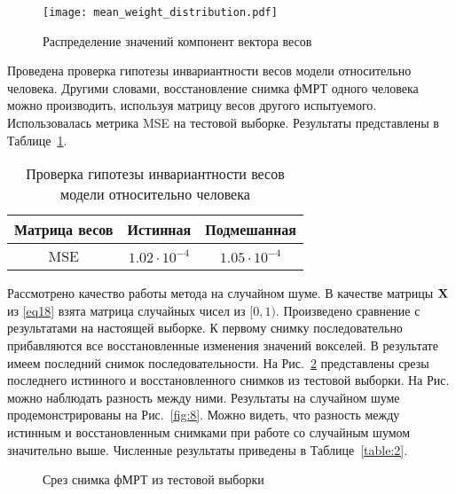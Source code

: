 \documentclass[a4paper, 12pt]{article}
\begin{document}
	\begin{figure}[h!]
		\centering
		\texttt{[image: mean\_weight\_distribution.pdf]}
		\caption{Распределение значений компонент вектора весов}
		\label{fig:6}
	\end{figure}

	Проведена проверка гипотезы инвариантности весов модели относительно человека.
	Другими словами, восстановление снимка фМРТ одного человека можно производить, используя
	матрицу весов другого испытуемого. Использовалась метрика MSE на тестовой выборке.
	Результаты представлены в Таблице~\ref{table:1}.

	\begin{table}[h!]
		\centering
		\begin{tabular}{|c|c|c|}
			\hline
			Матрица весов	&	Истинная	&	Подмешанная \\ \hline \hline
			MSE		& 	$1.02 \cdot 10^{-4}$	 &		$1.05 \cdot 10^{-4}$ \\ \hline
		\end{tabular}
		\caption{Проверка гипотезы инвариантности весов модели относительно человека}
		\label{table:1}
	\end{table}

	Рассмотрено качество работы метода на случайном шуме. В качестве матрицы $\mathbf{X}$ из \eqref{eq18}
	взята матрица случайных чисел из $[0, 1)$. Произведено сравнение с результатами на настоящей
	выборке. К первому снимку последовательно прибавляются все восстановленные изменения значений
	вокселей. В результате имеем последний снимок последовательности. На Рис.~\ref*{fig:7}
	представлены срезы последнего истинного и восстановленного снимков из тестовой выборки. 
	На Рис. можно наблюдать разность между ними.
	Результаты на случайном шуме продемонстрированы на Рис.~\ref*{fig:8}.
	Можно видеть, что разность между истинным и восстановленным снимками при работе со случайным шумом
	значительно выше. Численные результаты приведены в Таблице~\ref{table:2}.

	\begin{figure}[h!]
		\centering
		\hfill
		\hfill
		\caption{Срез снимка фМРТ из тестовой выборки}
		\label{fig:7}
	\end{figure}
\end{document}
